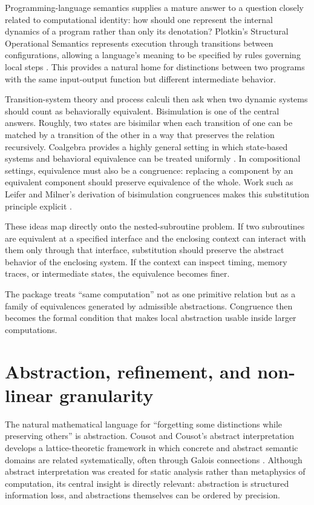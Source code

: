 \documentclass[11pt,a4paper]{article}
\begin{document}
Programming-language semantics supplies a mature answer to a question closely related to computational identity: how should one represent the internal dynamics of a program rather than only its denotation? Plotkin's Structural Operational Semantics represents execution through transitions between configurations, allowing a language's meaning to be specified by rules governing local steps \cite{Plotkin1981}. This provides a natural home for distinctions between two programs with the same input-output function but different intermediate behavior.

Transition-system theory and process calculi then ask when two dynamic systems should count as behaviorally equivalent. Bisimulation is one of the central answers. Roughly, two states are bisimilar when each transition of one can be matched by a transition of the other in a way that preserves the relation recursively. Coalgebra provides a highly general setting in which state-based systems and behavioral equivalence can be treated uniformly \cite{Rutten2000}. In compositional settings, equivalence must also be a congruence: replacing a component by an equivalent component should preserve equivalence of the whole. Work such as Leifer and Milner's derivation of bisimulation congruences makes this substitution principle explicit \cite{LeiferMilner2000}.

These ideas map directly onto the nested-subroutine problem. If two subroutines are equivalent at a specified interface and the enclosing context can interact with them only through that interface, substitution should preserve the abstract behavior of the enclosing system. If the context can inspect timing, memory traces, or intermediate states, the equivalence becomes finer.

\begin{takeawaybox}
The package treats ``same computation'' not as one primitive relation but as a family of equivalences generated by admissible abstractions. Congruence then becomes the formal condition that makes local abstraction usable inside larger computations.
\end{takeawaybox}

\section{Abstraction, refinement, and non-linear granularity}

The natural mathematical language for ``forgetting some distinctions while preserving others'' is abstraction. Cousot and Cousot's abstract interpretation develops a lattice-theoretic framework in which concrete and abstract semantic domains are related systematically, often through Galois connections \cite{Cousot1977}. Although abstract interpretation was created for static analysis rather than metaphysics of computation, its central insight is directly relevant: abstraction is structured information loss, and abstractions themselves can be ordered by precision.
\end{document}
